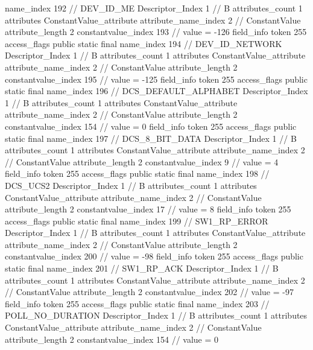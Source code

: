 {{{{{				name_index	192		// DEV_ID_ME
				Descriptor_Index	1		// B
				attributes_count	1
				attributes {
				ConstantValue_attribute {
					attribute_name_index	2		// ConstantValue
					attribute_length	2
					constantvalue_index	193		// value = -126
				}
				}
			}
			field_info {
				token	255
				access_flags	public static final
				name_index	194		// DEV_ID_NETWORK
				Descriptor_Index	1		// B
				attributes_count	1
				attributes {
				ConstantValue_attribute {
					attribute_name_index	2		// ConstantValue
					attribute_length	2
					constantvalue_index	195		// value = -125
				}
				}
			}
			field_info {
				token	255
				access_flags	public static final
				name_index	196		// DCS_DEFAULT_ALPHABET
				Descriptor_Index	1		// B
				attributes_count	1
				attributes {
				ConstantValue_attribute {
					attribute_name_index	2		// ConstantValue
					attribute_length	2
					constantvalue_index	154		// value = 0
				}
				}
			}
			field_info {
				token	255
				access_flags	public static final
				name_index	197		// DCS_8_BIT_DATA
				Descriptor_Index	1		// B
				attributes_count	1
				attributes {
				ConstantValue_attribute {
					attribute_name_index	2		// ConstantValue
					attribute_length	2
					constantvalue_index	9		// value = 4
				}
				}
			}
			field_info {
				token	255
				access_flags	public static final
				name_index	198		// DCS_UCS2
				Descriptor_Index	1		// B
				attributes_count	1
				attributes {
				ConstantValue_attribute {
					attribute_name_index	2		// ConstantValue
					attribute_length	2
					constantvalue_index	17		// value = 8
				}
				}
			}
			field_info {
				token	255
				access_flags	public static final
				name_index	199		// SW1_RP_ERROR
				Descriptor_Index	1		// B
				attributes_count	1
				attributes {
				ConstantValue_attribute {
					attribute_name_index	2		// ConstantValue
					attribute_length	2
					constantvalue_index	200		// value = -98
				}
				}
			}
			field_info {
				token	255
				access_flags	public static final
				name_index	201		// SW1_RP_ACK
				Descriptor_Index	1		// B
				attributes_count	1
				attributes {
				ConstantValue_attribute {
					attribute_name_index	2		// ConstantValue
					attribute_length	2
					constantvalue_index	202		// value = -97
				}
				}
			}
			field_info {
				token	255
				access_flags	public static final
				name_index	203		// POLL_NO_DURATION
				Descriptor_Index	1		// B
				attributes_count	1
				attributes {
				ConstantValue_attribute {
					attribute_name_index	2		// ConstantValue
					attribute_length	2
					constantvalue_index	154		// value = 0
				}
				}
			}
}}}}
